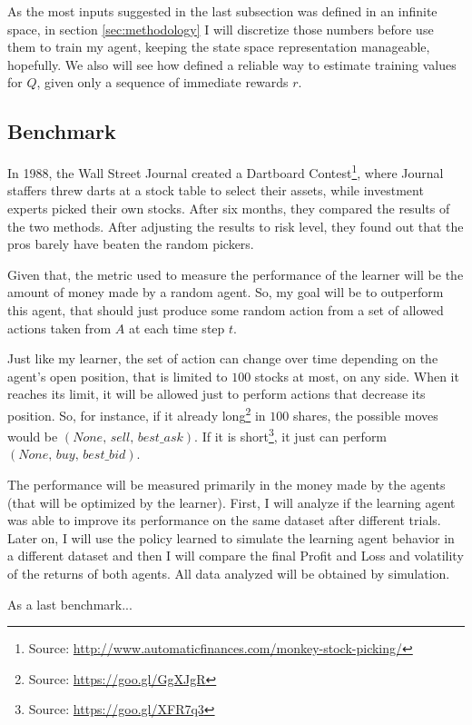 \documentclass[a4paper]{article}
\begin{document}
As the most inputs suggested in the last subsection was defined in an infinite space, in section \ref{sec:methodology} I will discretize those numbers before use them to train my agent, keeping the state space representation manageable, hopefully. We also will see how \cite{Mitchell} defined a reliable way to estimate training values for $Q$, given only a sequence of immediate rewards $r$.

\subsection{Benchmark}
In 1988, the Wall Street Journal created a Dartboard Contest\footnote{Source: \url{http://www.automaticfinances.com/monkey-stock-picking/}}, where Journal staffers threw darts at a stock table to select their assets, while investment experts picked their own stocks. After six months, they compared the results of the two methods. After adjusting the results to risk level, they found out that the pros barely have beaten the random pickers.

Given that, the metric used to measure the performance of the learner will be the amount of money made by a random agent. So, my goal will be to outperform this agent, that should just produce some random action from a set of allowed actions taken from $A$ at each time step $t$.

Just like my learner, the set of action can change over time depending on the agent's open position, that is limited to $100$ stocks at most, on any side. When it reaches its limit, it will be allowed just to perform actions that decrease its position. So, for instance, if it already long\footnote{Source: \url{https://goo.gl/GgXJgR}} in $100$ shares, the possible moves would be $\left (None,\, sell,\, best\_ask \right)$. If it is short\footnote{Source: \url{https://goo.gl/XFR7q3}}, it just can perform $\left (None,\, buy,\, best\_bid\right)$.

The performance will be measured primarily in the money made by the agents (that will be optimized by the learner). First, I will analyze if the learning agent was able to improve its performance on the same dataset after different trials. Later on, I will use the policy learned to simulate the learning agent behavior in a different dataset and then I will compare the final Profit and Loss and volatility of the returns of both agents. All data analyzed will be obtained by simulation.

As a last benchmark...
\end{document}
